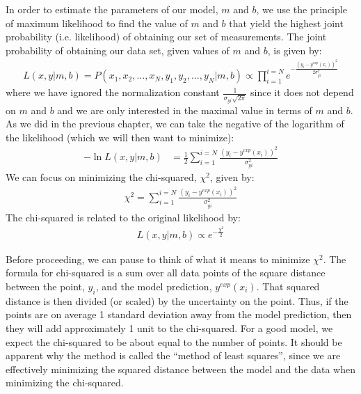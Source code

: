 In order to estimate the parameters of our model, $m$ and $b$, we use the principle of maximum likelihood to find the value of $m$ and $b$ that yield the highest joint probability (i.e. likelihood) of obtaining our set of measurements. The joint probability of obtaining our data set, given values of $m$ and $b$, is given by:
\begin{align*}
L(x,y|m,b) = P(x_1,x_2,\dots,x_N,y_1,y_2,\dots,y_N|m,b)\propto\prod_{i=1}^{i=N}e^{-\frac{(y_i-y^{exp}(x_i))^2}{2\sigma_{yi}^2}}
\end{align*}
where we have ignored the normalization constant $\frac{1}{\sigma_{yi}\sqrt{2\pi}}$ since it does not depend on $m$ and $b$ and we are only interested in the maximal value in terms of $m$ and $b$. As we did in the previous chapter, we can take the negative of the logarithm of the likelihood (which we will then want to minimize):
\begin{align}
-\ln{L(x,y|m,b)}&=\frac{1}{2}\sum_{i=1}^{i=N}\frac{(y_i-y^{exp}(x_i))^2}{\sigma_{yi}^2}
\end{align}
We can focus on minimizing the chi-squared, $\chi^2$, given by:
\begin{align}
\chi^2=\sum_{i=1}^{i=N}\frac{(y_i-y^{exp}(x_i))^2}{\sigma_{yi}^2}
\end{align}
The chi-squared is related to the original likelihood by:
\begin{align}
\label{eqn:chilike}
L(x,y|m,b) \propto e^{-\frac{\chi^2}{2}}
\end{align}

Before proceeding, we can pause to think of what it means to minimize $\chi^2$. The formula for chi-squared is a sum over all data points of the square distance between the point, $y_i$, and the model prediction, $y^{exp}(x_i)$. That squared distance is then divided (or scaled) by the uncertainty on the point. Thus, if the points are on average 1 standard deviation away from the model prediction, then they will add approximately 1 unit to the chi-squared. For a good model, we expect the chi-squared to be about equal to the number of points. It should be apparent why the method is called the ``method of least squares'', since we are effectively minimizing the squared distance between the model and the data when minimizing the chi-squared.

